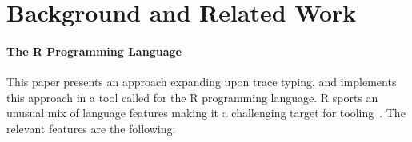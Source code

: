 \documentclass[sigplan,anonymous,review]{acmart}
\begin{document}
\section{Background and Related Work}
\label{sec:background}

\paragraph{The R Programming Language}

This paper presents an approach expanding upon trace typing, and implements this approach in a tool called \tool for the R programming language. 
R sports an unusual mix of language features making it a challenging target for
tooling~\cite{morandat2012evaluating}. 
The relevant features are the following:
\end{document}
